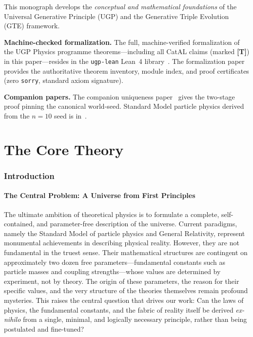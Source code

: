 \documentclass[12pt]{article}
\numberwithin{equation}{section}
\begin{document}
\begin{tcolorbox}[colback=blue!4!white,colframe=blue!55!black,
  title={\bfseries Reader's Note: Scope of This Monograph and the Lean Formalization},
  fonttitle=\bfseries,breakable]
This monograph develops the \emph{conceptual and mathematical foundations} of the Universal
Generative Principle (UGP) and the Generative Triple Evolution (GTE) framework.

\medskip\noindent
\textbf{Machine-checked formalization.} The full, machine-verified formalization of the
UGP Physics programme theorems—including all CatAL claims (marked \textbf{[T]}) in this paper—resides
in the \texttt{ugp-lean} Lean~4 library~\cite{SpivackUGPFormalization,ugp-lean}.
The formalization paper~\cite{SpivackUGPFormalization} provides the authoritative theorem
inventory, module index, and proof certificates (zero \texttt{sorry}, standard axiom
signature).

\medskip\noindent
\textbf{Companion papers.} The companion uniqueness paper~\cite{SpivackUGPUniqueness}
gives the two-stage proof pinning the canonical world-seed.  Standard Model particle
physics derived from the $n{=}10$ seed is in~\cite{Spivack2025_ParticlePhysics}.
\end{tcolorbox}

\tableofcontents


\part{The Core Theory}

\section{Introduction}
\label{sec:introduction}

\subsection{The Central Problem: A Universe from First Principles}
The ultimate ambition of theoretical physics is to formulate a complete, self-contained, and parameter-free description of the universe. Current paradigms, namely the Standard Model of particle physics and General Relativity, represent monumental achievements in describing physical reality. However, they are not fundamental in the truest sense. Their mathematical structures are contingent on approximately two dozen free parameters---fundamental constants such as particle masses and coupling strengths---whose values are determined by experiment, not by theory. The origin of these parameters, the reason for their specific values, and the very structure of the theories themselves remain profound mysteries. This raises the central question that drives our work: Can the laws of physics, the fundamental constants, and the fabric of reality itself be derived \textit{ex-nihilo} from a single, minimal, and logically necessary principle, rather than being postulated and fine-tuned?
\end{document}
